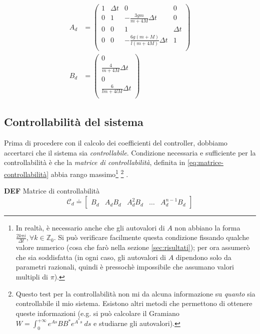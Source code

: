 \begin{equation}
  \begin{aligned}
  A_d &=
  \left(\begin{array}{cccc}1&\Delta t&0&0\\0&1&-\frac{3gm}{m+4M}\Delta t&0\\0&0&1&\Delta t\\0&0&-\frac{6g(m+M)}{l(m+4M)} \Delta t&1\\\end{array}\right)
  \\
  B_d &=
  \left(\begin{array}{c}0\\\frac{4}{m+4M} \Delta t\\0\\\frac{6}{lm+4lM} \Delta t\\\end{array}\right)
  \label{eq:Ad-e-Bd}
  \end{aligned}
\end{equation}

\subsection{Controllabilità del sistema}\label{subsec:controllabilità}
Prima di procedere con il calcolo dei coefficienti del controller, dobbiamo accertarci che il sistema sia \emph{controllabile}.
Condizione necessaria e sufficiente per la controllabilità è che la \emph{matrice di controllabilità}, definita in \eqref{eq:matrice-controllabilità}
abbia rango massimo\footnote{
  In realtà, è necessario anche che gli autovalori di $A$ non abbiano la forma $\frac {2k\pi i} {\Delta t}, \forall k \in \mathbb Z_0$.
  Si può verificare facilmente questa condizione fissando qualche valore numerico (cosa che farò nella sezione \ref{sec:risultati}); per
  ora assumerò che sia soddisfatta (in ogni caso, gli autovalori di $A$ dipendono solo da parametri razionali, quindi è
  pressochè impossibile che assumano valori multipli di $\pi$).
}%
\footnote{
  Questo test per la controllabilità non mi da alcuna informazione su \emph{quanto} sia controllabile il mio sistema.
  Esistono altri metodi che permettono di ottenere queste informazioni (e.g. si può calcolare il Gramiano
  $W=\int_0^{+\infty}e^{As}BB^*e^{A^*s}\ ds$ e studiarne gli autovalori).
}
\cite{sontag2013mathematical}.

\begin{framed}
  \textbf{DEF} Matrice di controllabilità
  \begin{equation}
    \mathcal C_d \doteq \left[
      \begin{matrix}
        B_d & A_dB_d & A_d^2B_d & \ldots & A_d^{n-1}B_d
      \end{matrix}
      \right]
    \label{eq:matrice-controllabilità}
  \end{equation}
\end{framed}

